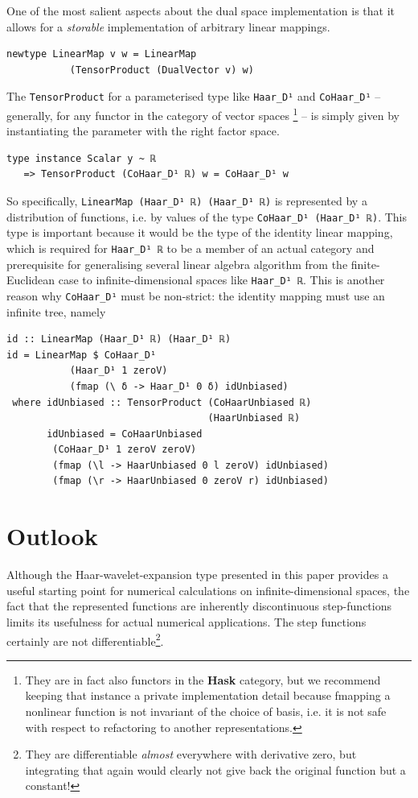 \documentclass[sigplan,screen]{acmart}
\theoremstyle{acmplain}
\theoremstyle{acmdefinition}
\begin{document}
One of the most salient aspects about the dual space implementation is that it allows for a \emph{storable} implementation of arbitrary linear mappings.
\begin{lstlisting}
newtype LinearMap v w = LinearMap
           (TensorProduct (DualVector v) w)
\end{lstlisting}
The \lstinline`TensorProduct` for a parameterised type like \lstinline`Haar_D¹` and \lstinline`CoHaar_D¹` -- generally, for any functor in the category of vector spaces%
\footnote{They are in fact also functors in the \textbf{Hask} category, but we recommend keeping that instance a private implementation detail because fmapping a nonlinear function is not invariant of the choice of basis, i.e. it is not safe with respect to refactoring to another representations.
} -- is simply given by instantiating the parameter with the right factor space.
\begin{lstlisting}
type instance Scalar y ~ ℝ
   => TensorProduct (CoHaar_D¹ ℝ) w = CoHaar_D¹ w
\end{lstlisting}
So specifically, \lstinline`LinearMap (Haar_D¹ ℝ) (Haar_D¹ ℝ)` is represented by a distribution of functions, i.e. by values of the type \lstinline`CoHaar_D¹ (Haar_D¹ ℝ)`.
This type is important because it would be the type of the identity linear mapping, which is required for \lstinline`Haar_D¹ ℝ` to be a member of an actual category and prerequisite for generalising several linear algebra algorithm from the finite-Euclidean case to infinite-dimensional spaces like \lstinline`Haar_D¹ ℝ`.
This is another reason why \lstinline`CoHaar_D¹` must be non-strict: the identity mapping must use an infinite tree, namely
\begin{lstlisting}
id :: LinearMap (Haar_D¹ ℝ) (Haar_D¹ ℝ)
id = LinearMap $ CoHaar_D¹
           (Haar_D¹ 1 zeroV)
           (fmap (\ δ -> Haar_D¹ 0 δ) idUnbiased)
 where idUnbiased :: TensorProduct (CoHaarUnbiased ℝ)
                                   (HaarUnbiased ℝ)
       idUnbiased = CoHaarUnbiased
        (CoHaar_D¹ 1 zeroV zeroV)
        (fmap (\l -> HaarUnbiased 0 l zeroV) idUnbiased)
        (fmap (\r -> HaarUnbiased 0 zeroV r) idUnbiased)
\end{lstlisting}

\section{Outlook}
Although the Haar-wavelet-expansion type presented in this paper provides a useful starting point for numerical calculations on infinite-dimensional spaces, the fact that the represented functions are inherently discontinuous step-functions limits its usefulness for actual numerical applications. The step functions certainly are not differentiable\footnote{%
They are differentiable \emph{almost} everywhere with derivative zero, but integrating that again would clearly not give back the original function but a constant!}.
\end{document}
